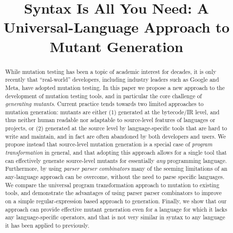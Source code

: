 \documentclass[acmsmall,screen,review,anonymous]{acmart}
\title{Syntax Is All You Need: A Universal-Language Approach to Mutant Generation}
\begin{document}

\renewcommand{\shortauthors}{Trovato et al.}

\begin{abstract}
  While mutation testing has been a topic of academic interest for
decades, it is only recently that ``real-world'' developers, including
industry leaders such as Google and Meta, have adopted mutation
testing.  In this paper we propose a new approach to the development of mutation
testing tools, and in particular the core challenge of
\emph{generating mutants}.  Current practice tends towards two
limited approaches to mutation generation: mutants are either (1)
generated at the bytecode/IR level, and thus neither human readable
nor adaptable to source-level features of languages or projects, or
(2) generated at the source level by language-specific tools that are
hard to write and maintain, and in fact are often abandoned by both
developers and users.  We propose instead that source-level mutation
generation is a special case of \emph{program transformation} in
general, and that adopting this approach allows for a single tool that
can effectively generate source-level mutants for essentially
\emph{any} programming language. Furthermore, by using \emph{parser
  parser combinators} many of the seeming limitations of an
any-language approach can be overcome, without the need to parse
specific languages.  We compare the universal program transformation
approach to mutation to existing tools, and demonstrate the advantages
of using parser parser combinators to improve on a simple regular-expression
based approach to generation.  Finally, we show that our approach
can provide effective mutant generation even for a language for which
it lacks any language-specific operators, and that is not very similar
in syntax to any language it has been applied to previously.
\end{abstract}
\end{document}
